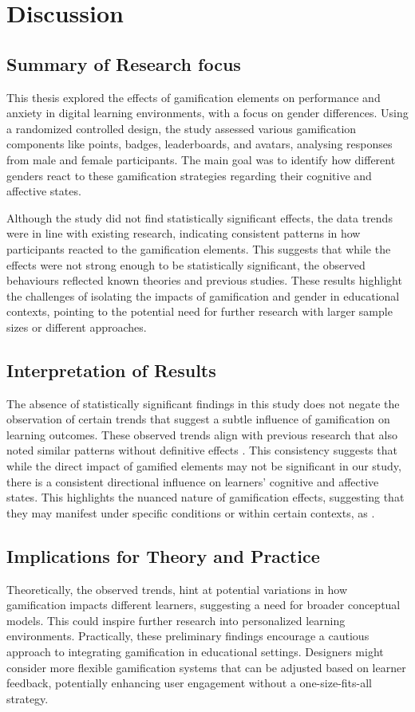 \section{Discussion}
\subsection{Summary of Research focus}
This thesis explored the effects of gamification elements on performance and anxiety in digital learning environments, with a focus on gender differences.
Using a randomized controlled design, the study assessed various gamification components like points, badges, leaderboards, and avatars, analysing responses from male and female participants.
The main goal was to identify how different genders react to these gamification strategies regarding their cognitive and affective states.

Although the study did not find statistically significant effects, the data trends were in line with existing research, indicating consistent patterns in how participants reacted to the gamification elements.
This suggests that while the effects were not strong enough to be statistically significant, the observed behaviours reflected known theories and previous studies.
These results highlight the challenges of isolating the impacts of gamification and gender in educational contexts, pointing to the potential need for further research with larger sample sizes or different approaches.
\subsection{Interpretation of Results}
The absence of statistically significant findings in this study does not negate the observation of certain trends that suggest a subtle influence of gamification on learning outcomes.
These observed trends align with previous research that also noted similar patterns without definitive effects \parencite{dehghanzadehUsingGamificationSupport2024,hamariDoesGamificationWork2014}.
This consistency suggests that while the direct impact of gamified elements may not be significant in our study, there is a consistent directional influence on learners' cognitive and affective states.
This highlights the nuanced nature of gamification effects, suggesting that they may manifest under specific conditions or within certain contexts, as \textcite{dehghanzadehUsingGamificationSupport2024,koivistoRiseMotivationalInformation2019}.

\subsection{Implications for Theory and Practice}
Theoretically, the observed trends, hint at potential variations in how gamification impacts different learners, suggesting a need for broader conceptual models.
This could inspire further research into personalized learning environments.
Practically, these preliminary findings encourage a cautious approach to integrating gamification in educational settings.
Designers might consider more flexible gamification systems that can be adjusted based on learner feedback, potentially enhancing user engagement without a one-size-fits-all strategy.


